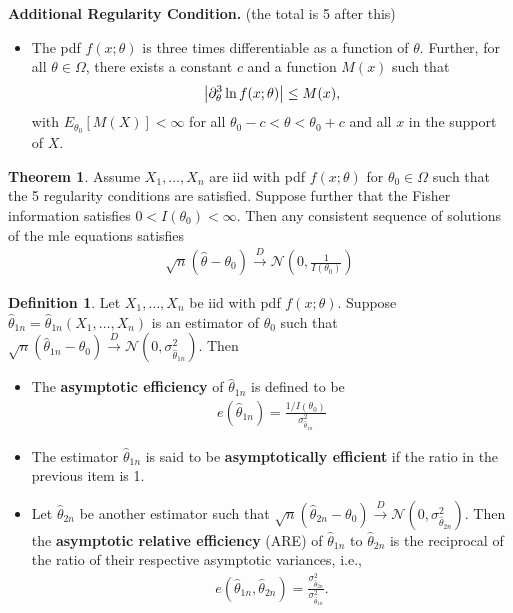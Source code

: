 \documentclass{book}
\theoremstyle{definition}
\newtheorem{defn}{Definition}[section]
\newtheorem{thm}{Theorem}[section]
\newcommand{\p}{\partial}
\newcommand{\N}{\mathcal{N}}
\newcommand{\f}[2]{\frac{#1}{#2}}
\newcommand{\lp}{\left(}
\newcommand{\rp}{\right)}
\begin{document}
\noindent \textbf{Additional Regularity Condition.} (the total is 5 after this)
\begin{itemize}
	\item The pdf $f(x;\theta)$ is three times differentiable as a function of $\theta$. Further, for all $\theta \in \Omega$, there exists a constant $c$ and a function $M(x)$ such that
	\begin{align}
	\abs{\p^3_\theta \ln f(x;\theta) } \leq M(x),
	\end{align}
	with $E_{\theta_0}[M(X)] < \infty$ for all $\theta_0 - c < \theta < \theta_0 + c$ and all $x$ in the support of $X$. 
\end{itemize}  




\begin{thm}
	Assume $X_1,\dots, X_n$ are iid with pdf $f(x;\theta)$ for $\theta_0 \in \Omega$ such that the 5 regularity conditions are satisfied. Suppose further that the Fisher information satisfies $0 < I(\theta_0 ) < \infty$. Then any consistent sequence of solutions of the mle equations satisfies
	\begin{align}
	\sqrt{n}(\hat\theta - \theta_0) \xrightarrow{D} \N\lp 0,\f{1}{I(\theta_0)} \rp
	\end{align}
\end{thm}



\begin{defn}
	Let $X_1,\dots,X_n$ be iid with pdf $f(x;\theta)$. Suppose $\hat{\theta}_{1n} = \hat{\theta}_{1n}(X_1,\dots,X_n)$ is an estimator of $\theta_0$ such that $\sqrt{n}(\hat{\theta}_{1n} - \theta_0) \xrightarrow{D} \N(0,\sigma^2_{\hat{\theta}_{1n}})$. Then
	\begin{itemize}
		\item The \textbf{asymptotic efficiency} of $\hat{\theta}_{1n}$ is defined to be
		\begin{align}
		e(\hat\theta_{1n}) = \f{1/I(\theta_0)}{\sigma^2_{\hat\theta_{1n}}}
		\end{align}
		
		\item The estimator $\hat\theta_{1n}$ is said to be \textbf{asymptotically efficient} if the ratio in the previous item is 1. 
		
		\item Let $\hat\theta_{2n}$ be another estimator such that  $\sqrt{n}(\hat{\theta}_{2n} - \theta_0) \xrightarrow{D} \N(0,\sigma^2_{\hat{\theta}_{2n}})$. Then the \textbf{asymptotic relative efficiency} (ARE) of $\hat\theta_{1n}$ to $\hat\theta_{2n}$ is the reciprocal of the ratio of their respective asymptotic variances, i.e., 
		\begin{align}
		e(\hat\theta_{1n}, \hat\theta_{2n}) = \f{\sigma^2_{\hat\theta_{2n}}}{\sigma^2_{\hat\theta_{1n}}}.
		\end{align}
	\end{itemize}
\end{defn}
\end{document}
